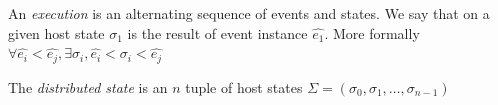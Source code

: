 \begin{definition}[Execution] \label{def:host_execution} An
    \textit{execution} is an alternating sequence of events and
    states. We say that on a given host state $\sigma_1$ is the result
    of event instance $\hat{e_1}$. More formally $\forall
    \hat{e_i} < \hat{e_j}, \exists \sigma_i, \hat{e_i} < \sigma_i <
    \hat{e_j}$
\end{definition}

\begin{definition} \label{def:distributed_state}
The \textit{distributed state} is an $n$ tuple of host states $\Sigma
= (\sigma_0,\sigma_1,\dots,\sigma_{n-1})$
\end{definition}









